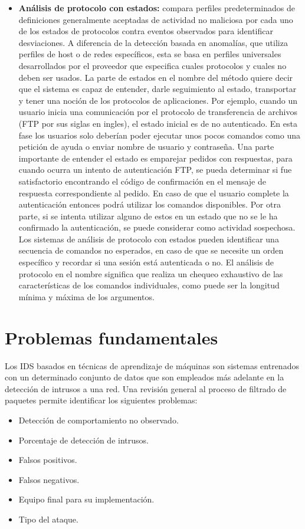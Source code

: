 \begin{itemize}
    \item \textbf{Análisis de protocolo con estados:} compara perfiles predeterminados de definiciones generalmente aceptadas de actividad no maliciosa por cada uno de los estados de protocolos contra eventos observados para identificar desviaciones. A diferencia de la detección basada en anomalías, que utiliza perfiles de host o de redes específicos, esta se basa en perfiles universales desarrollados por el proveedor que especifica cuales protocolos y cuales no deben ser usados. La parte de estados en el nombre del método quiere decir que el sistema es capaz de entender, darle seguimiento al estado, transportar y tener una noción de los protocolos de aplicaciones. Por ejemplo, cuando un usuario inicia una comunicación por el protocolo de transferencia de archivos (FTP por sus siglas en ingles), el estado inicial es de no autenticado. En esta fase los usuarios solo deberían poder ejecutar unos pocos comandos como una petición de ayuda o enviar nombre de usuario y contraseña. Una parte importante de entender el estado es emparejar pedidos con respuestas, para cuando ocurra un intento de autenticación FTP, se pueda determinar si fue satisfactorio encontrando el código de confirmación en el mensaje de respuesta correspondiente al pedido. En caso de que el usuario complete la autenticación entonces podrá utilizar los comandos disponibles. Por otra parte, si se intenta utilizar alguno de estos en un estado que no se le ha confirmado la autenticación, se puede considerar como actividad sospechosa. Los sistemas de análisis de protocolo con estados pueden identificar una secuencia de comandos no esperados, en caso de que se necesite un orden específico y recordar si una sesión está autenticada o no. El análisis de protocolo en el nombre significa que realiza un chequeo exhaustivo de las características de los comandos individuales, como puede ser la longitud mínima y máxima de los argumentos.
\end{itemize}

\section{Problemas fundamentales}
Los IDS basados en técnicas de aprendizaje de máquinas son sistemas entrenados con un determinado conjunto de datos que son empleados más adelante en la detección de intrusos a una red. Una revisión general al proceso de filtrado de paquetes permite identificar los siguientes problemas:
\begin{itemize}
    \item Detección de comportamiento no observado.
    \item Porcentaje de detección de intrusos.
    \item Falsos positivos.
    \item Falsos negativos.
    \item Equipo final para su implementación.
    \item Tipo del ataque.
\end{itemize}

